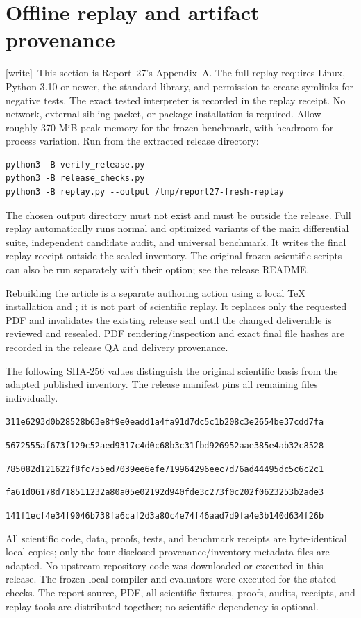 \documentclass[11pt,a4paper]{article}
\numberwithin{equation}{section}
\newcommand{\file}[1]{\texttt{\detokenize{#1}}}
\newcommand{\wtag}{\textup{[write]}}
\begin{document}
\section{Offline replay and artifact provenance}\label{fpa:rep:27:last}
\wtag\ This section is Report~27's Appendix~A.
The full replay requires Linux, Python 3.10 or newer, the standard library, and permission to create symlinks for negative tests. The exact tested interpreter is recorded in the replay receipt. No network, external sibling packet, or package installation is required. Allow roughly 370 MiB peak memory for the frozen benchmark, with headroom for process variation. Run from the extracted release directory:
\begin{verbatim}
python3 -B verify_release.py
python3 -B release_checks.py
python3 -B replay.py --output /tmp/report27-fresh-replay
\end{verbatim}
The chosen output directory must not exist and must be outside the release. Full replay automatically runs normal and optimized variants of the main differential suite, independent candidate audit, and universal benchmark. It writes the final replay receipt outside the sealed inventory. The original frozen scientific scripts can also be run separately with their \file{--output-dir} option; see the release README.

Rebuilding the article is a separate authoring action using a local TeX installation and \file{sh build.sh}; it is not part of scientific replay. It replaces only the requested PDF and invalidates the existing release seal until the changed deliverable is reviewed and resealed. PDF rendering/inspection and exact final file hashes are recorded in the release QA and delivery provenance.

The following SHA-256 values distinguish the original scientific basis from the adapted published inventory. The release manifest pins all remaining files individually.
\begin{description}[style=nextline]
\item[Original scientific manifest]
\nolinkurl{311e6293d0b28528b63e8f9e0eadd1a4fa91d7dc5c1b208c3e2654be37cdd7fa}
\item[Published scientific manifest]
\nolinkurl{5672555af673f129c52aed9317c4d0c68b3c31fbd926952aae385e4ab32c8528}
\item[Sparse evaluator]
\nolinkurl{785082d121622f8fc755ed7039ee6efe719964296eec7d76ad44495dc5c6c2c1}
\item[Universal source]
\nolinkurl{fa61d06178d718511232a80a05e02192d940fde3c273f0c202f0623253b2ade3}
\item[Report 26 scientific manifest]
\nolinkurl{141f1ecf4e34f9046b738fa6caf2d3a80c4e74f46aad7d9fa4e3b140d634f26b}
\end{description}
All scientific code, data, proofs, tests, and benchmark receipts are byte-identical local copies; only the four disclosed provenance/inventory metadata files are adapted. No upstream repository code was downloaded or executed in this release. The frozen local compiler and evaluators were executed for the stated checks. The report source, PDF, all scientific fixtures, proofs, audits, receipts, and replay tools are distributed together; no scientific dependency is optional.
\end{document}
